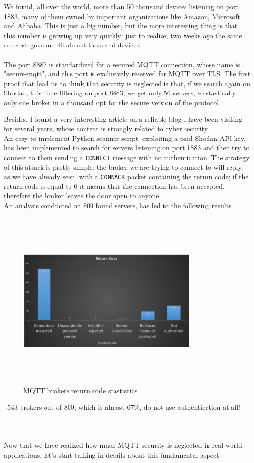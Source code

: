 \documentclass[12pt]{report}
\begin{document}
{We found, all over the world, more than 50 thousand devices listening on port 1883, many of them owned by important organizations like Amazon, Microsoft and Alibaba.
This is just a big number, but the more interesting thing is that this number is growing up very quickly: just to realize, two weeks ago the same research gave me 46 almost thousand devices.\\\\
The port 8883 is standardized for a secured MQTT connection, whose name is "secure-mqtt", and this port is exclusively reserved for MQTT over TLS.
The first proof that lead us to think that security is neglected is that, if we search again on Shodan, this time filtering on port 8883, we get only 56 servers, so stastically only one broker in a thousand opt for the secure version of the protocol.

Besides, I found a very interesting article on a reliable blog I have been visiting for several years, whose content is strongly related to cyber security.\\
An easy-to-implement Python scanner script, exploiting a paid Shodan API key, has been implemented to search for servers listening on port 1883 and then try to connect to them sending a \texttt{CONNECT} message with no authentication.
The strategy of this attack is pretty simple: the broker we are trying to connect to will reply, as we have already seen, with a \texttt{CONNACK} packet containing the return code; if the return code is equal to 0 it means that the connection has been accepted, therefore the broker leaves the door open to anyone.\\
An analysis conducted on 800 found servers, has led to the following results.

\begin{figure}[H]
\includegraphics[width=9cm,height=9cm,keepaspectratio]{shodan_results}
\centering
\caption{MQTT brokers return code stastistics}
\end{figure}\
543 brokers out of 800, which is almost 67\%, do not use authentication at all!
\\\\\\\\
Now that we have realized how much MQTT security is neglected in real-world applications, let's start talking in details about this fundamental aspect.

}
\end{document}
